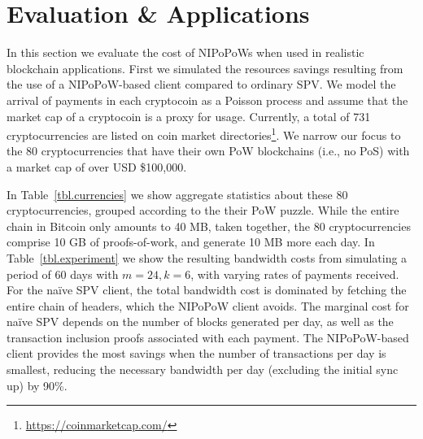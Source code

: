 \section{Evaluation \& Applications}
\label{sec.applications}
In this section we evaluate the cost of NIPoPoWs when used in realistic blockchain applications.
First we simulated the resources savings resulting from the use of a NIPoPoW-based
client compared to ordinary SPV. We model the arrival of payments in each cryptocoin as a Poisson process
and assume that the market cap of a cryptocoin is a proxy for usage. Currently,
a total of 731 cryptocurrencies are listed on coin market
directories\footnote{\url{https://coinmarketcap.com/}}. We narrow our focus to
the 80 cryptocurrencies that have their own PoW blockchains (i.e., no PoS) with
a market cap of over USD \$100,000.

In Table~\ref{tbl.currencies} we show aggregate statistics about these 80
cryptocurrencies, grouped according to the their PoW puzzle. While the entire
chain in Bitcoin only amounts to 40 MB, taken together, the 80 cryptocurrencies
comprise 10 GB of proofs-of-work, and generate 10 MB more each day. In
Table~\ref{tbl.experiment} we show the resulting bandwidth costs from simulating
a period of 60 days with $m=24, k=6$, with varying rates of payments received.
%
For the na\"ive SPV client, the total bandwidth cost is dominated by fetching
the entire chain of headers, which the NIPoPoW client avoids. The marginal
cost for na\"ive SPV depends on the number of blocks generated per day, as well
as the transaction inclusion proofs associated with each payment. The
NIPoPoW-based client provides the most savings when the number of transactions
per day is smallest, reducing the necessary bandwidth per day (excluding the
initial sync up) by 90\%.

